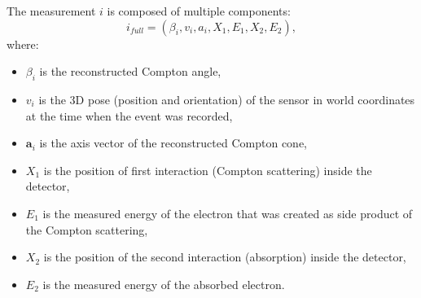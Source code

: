 The measurement $i$ is composed of multiple components:
\begin{equation}
  i_{full} = (\beta_{i}, v_{i}, a_{i}, X_{1}, E_{1}, X_{2}, E_{2}),
\end{equation}
where:
\begin{itemize}
  \item $\beta_{i}$ is the reconstructed Compton angle,
  \item $v_{i}$ is the 3D pose (position and orientation) of the sensor in world coordinates at the time when the event was recorded,
  \item $\mathbf{a}_{i}$ is the axis vector of the reconstructed Compton cone,
  \item $X_{1}$ is the position of first interaction (Compton scattering) inside the detector,
  \item $E_{1}$ is the measured energy of the electron that was created as side product of the Compton scattering,
  \item $X_{2}$ is the position of the second interaction (absorption) inside the detector,
  \item $E_{2}$ is the measured energy of the absorbed electron.
\end{itemize}

